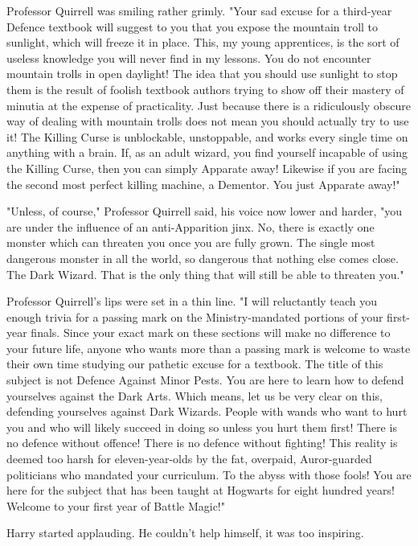 Professor Quirrell was smiling rather grimly. "Your sad excuse for a third-year 
Defence textbook will suggest to you that you expose the mountain troll to 
sunlight, which will freeze it in place. This, my young apprentices, is the 
sort of useless knowledge you will never find in my lessons. You do not 
encounter mountain trolls in open daylight! The idea that you should use 
sunlight to stop them is the result of foolish textbook authors trying to show 
off their mastery of minutia at the expense of practicality. Just because there 
is a ridiculously obscure way of dealing with mountain trolls does not mean you 
should actually try to use it! The Killing Curse is unblockable, unstoppable, 
and works every single time on anything with a brain. If, as an adult wizard, 
you find yourself incapable of using the Killing Curse, then you can simply 
Apparate away! Likewise if you are facing the second most perfect killing 
machine, a Dementor. You just Apparate away!"

"Unless, of course," Professor Quirrell said, his voice now lower and harder, 
"you are under the influence of an anti-Apparition jinx. No, there is exactly 
one monster which can threaten you once you are fully grown. The single most 
dangerous monster in all the world, so dangerous that nothing else comes close. 
The Dark Wizard. That is the only thing that will still be able to threaten 
you."

Professor Quirrell's lips were set in a thin line. "I will reluctantly teach 
you enough trivia for a passing mark on the Ministry-mandated portions of your 
first-year finals. Since your exact mark on these sections will make no 
difference to your future life, anyone who wants more than a passing mark is 
welcome to waste their own time studying our pathetic excuse for a textbook. 
The title of this subject is not Defence Against Minor Pests. You are here to 
learn how to defend yourselves against the Dark Arts. Which means, let us be 
very clear on this, defending yourselves against Dark Wizards. People with 
wands who want to hurt you and who will likely succeed in doing so unless you 
hurt them first! There is no defence without offence! There is no defence 
without fighting! This reality is deemed too harsh for eleven-year-olds by the 
fat, overpaid, Auror-guarded politicians who mandated your curriculum. To the 
abyss with those fools! You are here for the subject that has been taught at 
Hogwarts for eight hundred years! Welcome to your first year of Battle Magic!"

Harry started applauding. He couldn't help himself, it was too inspiring.

